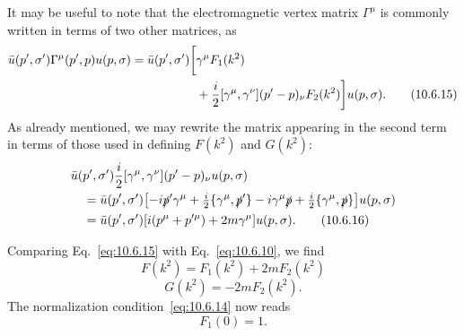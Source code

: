 It may be useful to note that the electromagnetic vertex matrix $\Gamma^\mu$
is commonly written in terms of two other matrices, as
\begin{align}
  \bar u(p',\sigma')\Gamma^\mu(p',p)u(p,\sigma)
  =\bar u(p',\sigma')\biggl[&\gamma^\mu F_1(k^2) \notag\\
  &+\frac{i}{2}[\gamma^\mu,\gamma^\nu](p'-p)_\nu F_2(k^2)
  \biggr]u(p,\sigma).
  \tag{10.6.15}\label{eq:10.6.15}
\end{align}
As already mentioned, we may rewrite the matrix appearing in the second term
in terms of those used in defining $F(k^2)$ and $G(k^2)$:
\begin{align}
  &\bar u(p',\sigma')\frac{i}{2}[\gamma^\mu,\gamma^\nu]
  (p'-p)_\nu u(p,\sigma) \notag\\
  &\quad=\bar u(p',\sigma')\bigl[
  -i\sl{p}'\gamma^\mu+\tfrac{i}{2}\{\gamma^\mu,\sl{p}'\}
  -i\gamma^\mu\sl{p}+\tfrac{i}{2}\{\gamma^\mu,\sl{p}\}
  \bigr]u(p,\sigma) \notag\\
  &\quad=\bar u(p',\sigma')
  [i(p^\mu+p'^\mu)+2m\gamma^\mu]u(p,\sigma).
  \tag{10.6.16}\label{eq:10.6.16}
\end{align}

Comparing Eq.~\eqref{eq:10.6.15} with Eq.~\eqref{eq:10.6.10}, we find
\begin{equation}
  F(k^2)=F_1(k^2)+2mF_2(k^2)
  \tag{10.6.17}\label{eq:10.6.17}
\end{equation}
\begin{equation}
  G(k^2)=-2mF_2(k^2).
  \tag{10.6.18}\label{eq:10.6.18}
\end{equation}
The normalization condition~\eqref{eq:10.6.14} now reads
\begin{equation*}
  F_1(0)=1.
\end{equation*}

